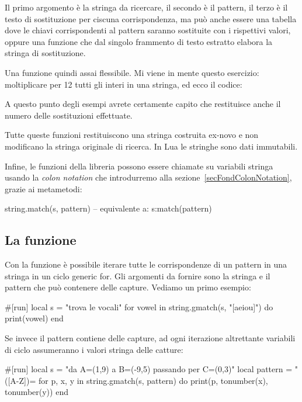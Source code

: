Il primo argomento è la stringa da ricercare, il secondo è il pattern, il terzo
è il testo di sostituzione per ciscuna corrispondenza, ma può anche essere una
tabella dove le chiavi corrispondenti al pattern saranno sostituite con i
rispettivi valori, oppure una funzione che dal singolo frammento di testo
estratto elabora la stringa di sostituzione.

Una funzione quindi assai flessibile. Mi viene in mente questo esercizio:
moltiplicare per 12 tutti gli interi in una stringa, ed ecco il codice:

A questo punto degli esempi avrete certamente capito che  restituisce
anche il numero delle sostituzioni effettuate.

Tutte queste funzioni restituiscono una stringa costruita ex-novo e non
modificano la stringa originale di ricerca. In Lua le stringhe sono dati
immutabili.

Infine, le funzioni della libreria  possono essere chiamate su
variabili stringa usando la \emph{colon notation} che introdurremo alla
sezione~\ref{secFondColonNotation}, grazie ai metametodi:
\begin{lines}
string.match(s, pattern) -- equivalente a:
s:match(pattern)
\end{lines}


\subsection{La funzione }

Con la funzione  è possibile iterare
tutte le corrispondenze di un pattern in una stringa in un ciclo generic for.
Gli argomenti da fornire sono la stringa e il pattern che può contenere delle
capture. Vediamo un primo esempio:
\begin{lines}
#[run]
local s = "trova le vocali"
for vowel in string.gmatch(s, "[aeiou]") do
    print(vowel)
end
\end{lines}

Se invece il pattern contiene delle capture, ad ogni iterazione altrettante
variabili di ciclo assumeranno i valori stringa delle catture:
\begin{lines}
#[run]
local s = "da A=(1,9) a B=(-9,5) passando per C=(0,3)"
local pattern = "([A-Z])=%
for p, x, y in string.gmatch(s, pattern) do
    print(p, tonumber(x), tonumber(y))
end
\end{lines}

